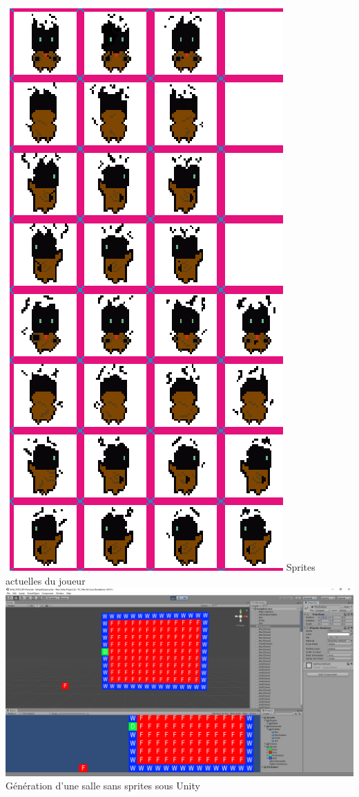 \documentclass[]{extarticle}
\begin{document}
\begin{center}
\includegraphics[scale = 0.25]{spritePerso.png}
\smallbreak
Sprites actuelles du joueur
\bigbreak
\bigbreak
\includegraphics[scale = 0.23]{generation.PNG}
\smallbreak
Génération d'une salle sans sprites sous Unity
\bigbreak
\bigbreak

\end{center}
\end{document}
